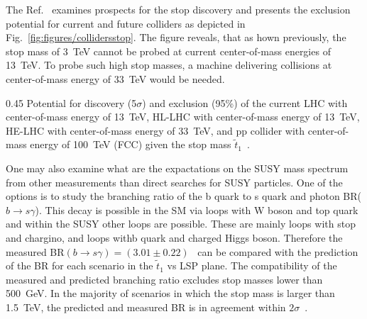 The Ref.~\cite{Baer:2016bwh} examines prospects for the stop discovery and presents the exclusion potential for current and future colliders as depicted in Fig.~\ref{fig:figures/collidersstop}. The figure reveals, that as hown previously, the stop mass of 3~TeV cannot be probed at current center-of-mass energies of 13~TeV. To probe such high stop masses, a machine delivering collisions at center-of-mass energy of 33~TeV would be needed. 

                 {0.45}       %
                 { Potential for discovery (5$\sigma$) and exclusion (95\%) of the current LHC with center-of-mass energy of 13~TeV, HL-LHC with center-of-mass energy of 13~TeV, HE-LHC with center-of-mass energy of 33~TeV,  and pp collider with center-of-mass energy of 100~TeV (FCC) given the stop mass $\tilde{t}_{1}$~\cite{Baer:2016bwh}.  }


One may also examine what are the expactations on the SUSY mass spectrum from other measurements than direct searches for SUSY particles. One of the options is to study the branching ratio of the b quark to s quark and photon BR($b \to s\gamma$).  This decay is possible in the SM via loops with W boson and top quark and within the SUSY other loops are possible. These are mainly loops with  stop and chargino, and loops withb quark and charged Higgs boson. Therefore the measured BR$(b \to s\gamma) = (3.01 \pm 0.22)$~\cite{Belle:2016ufb} can be compared with the prediction of the BR for each scenario in the $\tilde{t}_{1}$ vs LSP plane. The compatibility of the measured and predicted branching ratio excludes stop masses lower than 500~GeV. In the majority of scenarios in which the stop mass is larger than 1.5~TeV, the predicted and measured BR is in agreement within $2\sigma$~\cite{Baer:2016bwh}.

